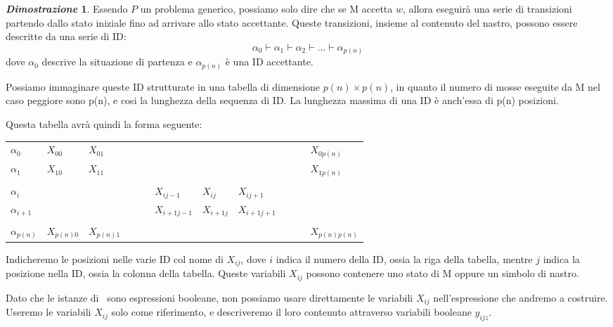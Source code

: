 \documentclass[12pt]{article}
\theoremstyle{definition}
\newtheorem*{myproof}{\em Dimostrazione}
\begin{document}
\begin{myproof}
Essendo \(P\) un problema generico, possiamo solo dire che se M accetta \(w\), allora eseguir\`a
una serie di transizioni partendo dallo stato iniziale fino ad arrivare allo stato accettante.
Queste transizioni, insieme al contenuto del nastro, possono essere descritte da una serie di ID: \[
\alpha_0 \vdash \alpha_1 \vdash \alpha_2 \vdash \ldots \vdash \alpha_{p(n)}
\] dove \(\alpha_0\) descrive la situazione di partenza e \(\alpha_{p(n)}\) \`e una ID accettante.

Possiamo immaginare queste ID strutturate in una tabella di dimensione \(p(n) \times p(n)\),
in quanto il numero di mosse eseguite da M nel caso peggiore sono p(n), e cosi la lunghezza della sequenza di ID.
La lunghezza massima di una ID \`e anch'essa di p(n) posizioni.

Questa tabella avr\`a quindi la forma seguente:


\begin{table}[!ht]
\centering
\begin{tabular}{l|l|l|l|l|l|l|l|l|}
\cline{2-9}
 \(\alpha_0\) & \(X_{00}\) & \(X_{01}\) &  &  &  &  & & \(X_{0p(n)}\) \\ \cline{2-9} 
 \(\alpha_1\) & \(X_{10}\) & \(X_{11}\) &  &  &  &  & &  \(X_{1p(n)}\) \\ \cline{2-9} 
 &  &  &  &  &  &  &  & \\ \cline{2-9} 
 \(\alpha_i\) &  &  & \ \ \ &  \(X_{ij-1}\) & \(X_{ij}\) &  \(X_{ij+1}\) & \ \ \ & \\ \cline{2-9} 
 \(\alpha_{i+1}\) &  &  & \ \ \ &  \(X_{i+1j-1}\) & \(X_{i+1j}\) &  \(X_{i+1j+1}\) & \ \ \ & \\ \cline{2-9}
 &  &  &  &  &  &  &  &   \\ \cline{2-9}  
 \(\alpha_{p(n)}\) & \(X_{p(n)0}\)  & \(X_{p(n)1}\)  &  &  &  &  &  &  \(X_{p(n)p(n)}\) \\ \cline{2-9}
\end{tabular}
\end{table}

Indicheremo le posizioni nelle varie ID col nome di \(X_{ij}\), dove \(i\) indica il numero
della ID, ossia la riga della tabella, mentre \(j\) indica la posizione nella ID, ossia la colonna della tabella.
Queste variabili \(X_{ij}\) possono contenere uno stato di M oppure un simbolo di nastro.

Dato che le istanze di \SAT\ sono espressioni booleane, non possiamo usare direttamente le variabili \(X_{ij}\)
nell'espressione che andremo a costruire. Useremo le variabili \(X_{ij}\) solo come riferimento, e descriveremo
il loro contenuto attraverso variabili booleane \(y_{ijz}\).


\end{myproof}
\end{document}
